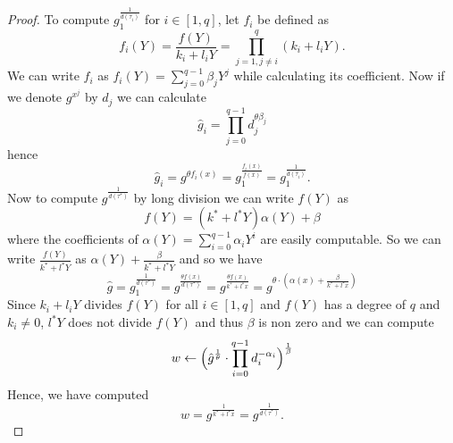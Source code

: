 \begin{proof}
	To compute $g_1^{\frac{1}{d(\tau_i)}}$ for $i \in [1,q]$, let $f_i$ be defined as
	$$f_i(Y) = \frac{f(Y)}{k_i+l_iY} = \prod_{j=1, j \neq i}^q (k_i + l_iY).$$
	We can write $f_i$ as 
	$f_i(Y) = \sum_{j=0}^{q-1} \beta_jY^j$ while calculating its coefficient.  Now if we denote $g^{x^j}$ by $d_j$ we can calculate
	$$\hat{g}_i = \prod_{j=0}^{q-1} d_j^{\theta\beta_j}$$
	hence
	$$\hat{g}_i = g^{\theta f_i(x)} = g_1^{\frac{ f_i(x)}{f(x)}}=   g_1^{\frac{1}{d(\tau_i)}}.$$
	Now to compute $g^\frac{1}{d(\tau^*)}$ by long division we can write $f(Y)$ as 
	$$f(Y) = (k^*+l^*Y)\alpha(Y) + \beta$$
	where the coefficients of $\alpha(Y) = \sum_{i=0}^{q-1} \alpha_iY^i$ are easily computable. So we can write $\frac{f(Y)}{k^*+l^*Y}$ as $\alpha(Y) + \frac{\beta}{k^*+l^*Y}$ and so we have
	$$\hat{g} = g_1^{\frac{1}{d(\tau^*)}} =g^{\frac{\theta f(x)}{d(\tau^*)}}=g^{\frac{\theta f(x)}{k^* + l^*x}} = g^{\theta\cdot(\alpha(x) + \frac{\beta}{k^*+l^*x})} $$
	Since $k_i +l_iY$ divides $f(Y)$ for all $i\in [1,q]$ and $f(Y)$ has a degree of $q$ and $k_i \neq 0$, $l^*Y$ does not divide $f(Y)$ and thus $\beta$ is non zero and we can compute
	$$w \leftarrow \Big{(} \hat{g}^{\frac{1}{\theta}} \cdot \prod_{i=0}^{q-1} d_i^{-\alpha_i}\Big{)}^{\frac{1}{\beta}}$$
	Hence, we have computed
	$$w  = g^{\frac{1}{k^*+l^*x}} = g^\frac{1}{d(\tau^*)}.$$
	
\end{proof}



